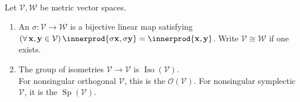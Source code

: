 \begin{definition} \label{def:metric-isometry-and-classical-groups} \\
Let $\mathcal{V},\mathcal{W}$ be metric vector spaces.
\begin{enumerate}[label=(\roman*)]
\setlength{\itemsep}{0pt}
\item An  $\sigma:\mathcal{V}\to\mathcal{W}$ is a bijective linear map satisfying $(\forall\,\mathbf{x},\mathbf{y}\in\mathcal{V})\,\innerprod{\sigma\mathbf{x},\sigma\mathbf{y}}=\innerprod{\mathbf{x},\mathbf{y}}$. Write $\mathcal{V}\cong\mathcal{W}$ if one exists.
\item The group of isometries $\mathcal{V}\to\mathcal{V}$ is $\operatorname{Iso}(\mathcal{V})$.\\
For nonsingular orthogonal $\mathcal{V}$, this is the  $\mathcal{O}(\mathcal{V})$. For nonsingular symplectic $\mathcal{V}$, it is the  $\operatorname{Sp}(\mathcal{V})$.
\end{enumerate}
\end{definition}

